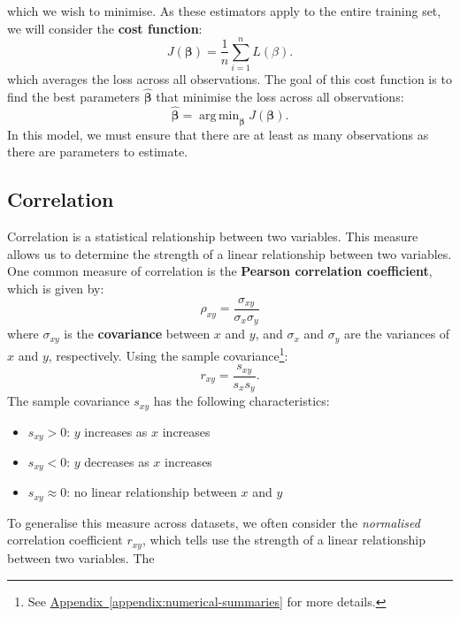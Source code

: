 \documentclass{article}
\DeclareMathOperator*{\argmin}{arg\,min}
\begin{document}
which we wish to minimise. As these estimators apply to the entire
training set, we will consider the \textbf{cost function}:
\begin{equation*}
    J\left( \symbf{\beta} \right) = \frac{1}{n} \sum_{i = 1}^n L\left( \beta \right).
\end{equation*}
which averages the loss across all observations. The goal of this cost
function is to find the best parameters \(\hat{\symbf{\beta}}\) that minimise
the loss across all observations:
\begin{equation*}
    \hat{\symbf{\beta}} = \argmin_{\symbf{\beta}} J\left( \symbf{\beta} \right).
\end{equation*}
In this model, we must ensure that there are at least as many
observations as there are parameters to estimate.
\subsection{Correlation}
Correlation is a statistical relationship between two variables. This
measure allows us to determine the strength of a linear relationship
between two variables. One common measure of correlation is the
\textbf{Pearson correlation coefficient}, which is given by:
\begin{equation*}
    \rho_{xy} = \frac{\sigma_{xy}}{\sigma_x \sigma_y}
\end{equation*}
where \(\sigma_{xy}\) is the \textbf{covariance} between \(x\) and \(y\),
and \(\sigma_x\) and \(\sigma_y\) are the variances of \(x\) and \(y\),
respectively. Using the sample covariance\footnote{See
    \hyperref[appendix:numerical-summaries]{Appendix~\ref*{appendix:numerical-summaries}}
    for more details.}:
\begin{equation*}
    r_{xy} = \frac{s_{xy}}{s_x s_y}.
\end{equation*}
The sample covariance \(s_{xy}\) has the following characteristics:
\begin{itemize}
    \item \(s_{xy} > 0\): \(y\) increases as \(x\) increases
    \item \(s_{xy} < 0\): \(y\) decreases as \(x\) increases
    \item \(s_{xy} \approx 0\): no linear relationship between \(x\) and \(y\)
\end{itemize}
To generalise this measure across datasets, we often consider the
\textit{normalised} correlation coefficient \(r_{xy}\), which tells use
the strength of a linear relationship between two variables. The
\end{document}
